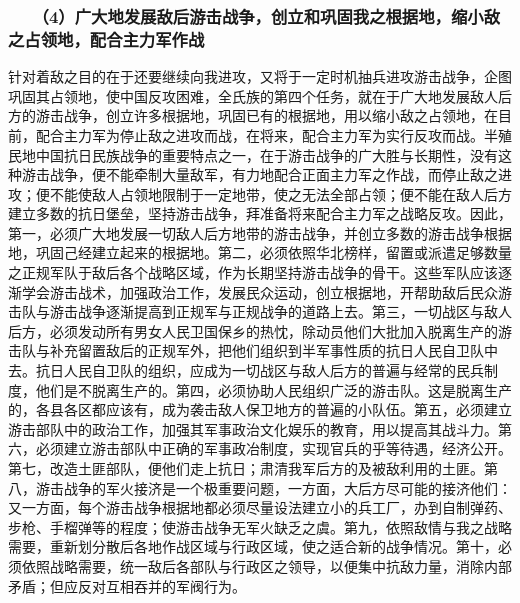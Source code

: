 \documentclass[cn,11pt,chinese]{elegantbook}
\def\myformat#1{\hfil\hfil #1}
\begin{document}
\subsubsection*{\myformat{　　（4）广大地发展敌后游击战争，创立和巩固我之根据地，缩小敌之占领地，配合主力军作战}}
针对着敌之目的在于还要继续向我进攻，又将于一定时机抽兵进攻游击战争，企图巩固其占领地，使中国反攻困难，全氏族的第四个任务，就在于广大地发展敌人后方的游击战争，创立许多根据地，巩固已有的根据地，用以缩小敌之占领地，在目前，配合主力军为停止敌之进攻而战，在将来，配合主力军为实行反攻而战。半殖民地中国抗日民族战争的重要特点之一，在于游击战争的广大胜与长期性，没有这种游击战争，便不能牵制大量敌军，有力地配合正面主力军之作战，而停止敌之进攻；便不能使敌人占领地限制于一定地带，使之无法全部占领；便不能在敌人后方建立多数的抗日堡垒，坚持游击战争，拜准备将来配合主力军之战略反攻。因此，第一，必须广大地发展一切敌人后方地带的游击战争，并创立多数的游击战争根据地，巩固己经建立起来的根据地。第二，必须依照华北榜样，留置或派遣足够数量之正规军队于敌后各个战略区域，作为长期坚持游击战争的骨干。这些军队应该逐渐学会游击战术，加强政治工作，发展民众运动，创立根据地，开帮助敌后民众游击队与游击战争逐渐提高到正规军与正规战争的道路上去。第三，一切战区与敌人后方，必须发动所有男女人民卫国保乡的热忱，除动员他们大批加入脱离生产的游击队与补充留置敌后的正规军外，把他们组织到半军事性质的抗日人民自卫队中去。抗日人民自卫队的组织，应成为一切战区与敌人后方的普遍与经常的民兵制度，他们是不脱离生产的。第四，必须协助人民组织广泛的游击队。这是脱离生产的，各县各区都应该有，成为袭击敌人保卫地方的普遍的小队伍。第五，必须建立游击部队中的政治工作，加强其军事政治文化娱乐的教育，用以提高其战斗力。第六，必须建立游击部队中正确的军事政冶制度，实现官兵的乎等待遇，经济公开。第七，改造土匪部队，便他们走上抗日；肃清我军后方的及被敌利用的土匪。第八，游击战争的军火接济是一个极重要问题，一方面，大后方尽可能的接济他们：又一方面，每个游击战争根据地都必须尽量设法建立小的兵工厂，办到自制弹药、步枪、手榴弹等的程度；使游击战争无军火缺乏之虞。第九，依照敌情与我之战略需要，重新划分散后各地作战区域与行政区域，使之适合新的战争情况。第十，必须依照战略需要，统一敌后各部队与行政区之领导，以便集中抗敌力量，消除内部矛盾；但应反对互相吞并的军阀行为。\\
\end{document}
